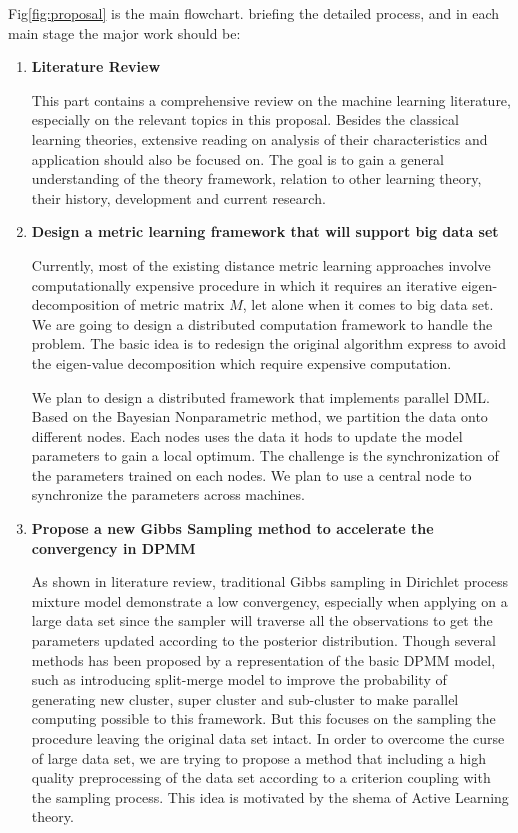 Fig\ref{fig:proposal} is the main flowchart.  briefing the detailed process, and in each main stage the major work should be:
\begin{enumerate}
 \item \textbf{Literature Review}
 
 This part contains a comprehensive review on the machine learning literature, especially on the relevant topics in this proposal. Besides the classical learning theories, extensive reading on analysis of their characteristics and application should also be focused on. The goal is to gain a general understanding of the theory framework, relation to other learning theory,  their history, development and current research. 
 
 \item \textbf{Design a metric learning framework that will support big data set }
 
 Currently, most of the existing distance metric learning approaches involve computationally expensive procedure in which it requires an iterative eigen-decomposition of metric matrix $M$, let alone when it comes to big data set. We are going to design a distributed computation framework to handle the problem. The basic idea is to redesign the original algorithm express to avoid the eigen-value decomposition which require expensive computation. 
 
 We plan to design a distributed framework that implements parallel DML. Based on the Bayesian Nonparametric method, we partition the data onto different nodes. Each nodes uses the data it hods to update the model parameters to gain a local optimum. The challenge is the synchronization of the parameters trained on each nodes. We plan to use a central node to synchronize the parameters across machines.
 
 \item \textbf{Propose a new Gibbs Sampling method to accelerate the convergency in DPMM}
 
 As shown in literature review, traditional Gibbs sampling in Dirichlet process mixture model demonstrate a low convergency, especially when applying on a large data set since the sampler will traverse all the observations to get the parameters updated according to the posterior distribution. Though several methods has been proposed by a representation of the basic DPMM model, such as introducing split-merge model to improve the probability of generating new cluster, super cluster and sub-cluster to make parallel computing possible to this framework. But this focuses on the sampling the procedure leaving the original data set intact. In order to overcome the curse of large data set, we are trying to propose a method that including a high quality preprocessing of the data set according to a criterion coupling with the sampling process. This idea is motivated by the shema of Active Learning theory. 
 

\end{enumerate}
